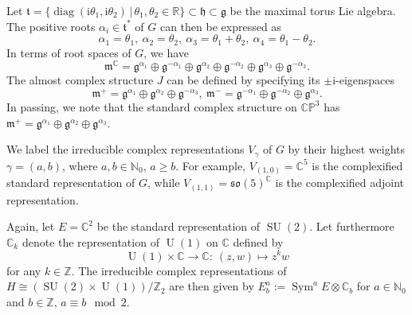 \documentclass[12pt]{scrartcl}
\theoremstyle{plain}
\theoremstyle{definition}
\newcommand{\R}{\mathbb{R}}%
\newcommand{\C}{\mathbb{C}}%
\newcommand{\N}{\mathbb{N}}%
\newcommand{\Z}{\mathbb{Z}}%
\newcommand{\CP}{\mathbb{CP}}%
\newcommand{\Sym}{\operatorname{Sym}}%
\newcommand{\diag}{\operatorname{diag}}%
\newcommand{\U}{\operatorname{U}}%
\newcommand{\SU}{\operatorname{SU}}%
\newcommand{\so}{\mathfrak{so}}%
\renewcommand{\i}{\mathrm{i}}%
\newcommand{\m}{\mathfrak{m}}%
\newcommand{\h}{\mathfrak{h}}%
\newcommand{\g}{\mathfrak{g}}%
\renewcommand{\t}{\mathfrak{t}}%
\begin{document}
Let $\t=\{\diag(\i\theta_1,\i\theta_2)\,|\,\theta_1,\theta_2\in\R\}\subset\h\subset\g$ be the maximal torus Lie algebra. The positive roots $\alpha_i\in\t^\ast$ of $G$ can then be expressed as
\[\alpha_1=\theta_1,\ \alpha_2=\theta_2,\ \alpha_3=\theta_1+\theta_2,\ \alpha_4=\theta_1-\theta_2.\]
In terms of root spaces of $G$, we have
\begin{equation}
\m^\C=\g^{\alpha_1}\oplus\g^{-\alpha_1}\oplus\g^{\alpha_2}\oplus\g^{-\alpha_2}\oplus\g^{\alpha_3}\oplus\g^{-\alpha_3}.\label{cp3root}
\end{equation}
The almost complex structure $J$ can be defined by specifying its $\pm\i$-eigenspaces
\[\m^+=\g^{\alpha_1}\oplus\g^{\alpha_2}\oplus\g^{-\alpha_3},\ \m^-=\g^{-\alpha_1}\oplus\g^{-\alpha_2}\oplus\g^{\alpha_3}.\]
In passing, we note that the standard complex structure on $\CP^3$ has $\m^+=\g^{\alpha_1}\oplus\g^{\alpha_2}\oplus\g^{\alpha_3}$.

We label the irreducible complex representations $V_\gamma$ of $G$ by their highest weights $\gamma=(a,b)$, where $a,b\in\N_0$, $a\geq b$. For example, $V_{(1,0)}=\C^5$ is the complexified standard representation of $G$, while $V_{(1,1)}=\so(5)^\C$ is the complexified adjoint representation.

Again, let $E=\C^2$ be the standard representation of $\SU(2)$. Let furthermore $\C_k$ denote the representation of $\U(1)$ on $\C$ defined by
\[\U(1)\times\C\to\C:\ (z,w)\mapsto z^kw\]
for any $k\in\Z$. The irreducible complex representations of $H\cong(\SU(2)\times\U(1))/\Z_2$ are then given by $E^a_b:=\Sym^aE\otimes\C_b$ for $a\in\N_0$ and $b\in\Z$, $a\equiv b\mod 2$.
\end{document}
